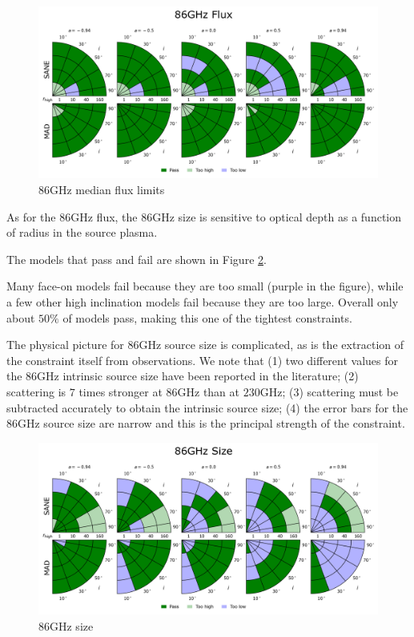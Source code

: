 \begin{figure}
  \centering
  \includegraphics[width=\columnwidth]{./figures/86GHz_flux_Constraints.png}
  \caption{86GHz median flux limits}
  \label{fig:cmp_86ghz_flux}
\end{figure}



As for the $86$GHz flux, the $86$GHz size is sensitive to optical depth as a function of radius in the source plasma.

The models that pass and fail are shown in Figure \ref{fig:cmp_86ghz_size}.

Many face-on models fail because they are too small (purple in the figure), while a few other high inclination models fail because they are too large.  Overall only about $50\%$ of models pass, making this one of the tightest constraints.

The physical picture for 86GHz source size is complicated, as is the extraction of the constraint itself from observations.  We note that (1) two different values for the 86GHz intrinsic source size have been reported in the literature; (2) scattering is $7$ times stronger at $86$GHz than at $230$GHz; (3) scattering must be subtracted accurately to obtain the intrinsic source size; (4) the error bars for the 86GHz source size are narrow and this is the principal strength of the constraint.

\begin{figure}
  \centering
  \includegraphics[width=\columnwidth]{./figures/86GHz_size_Constraints.png}
  \caption{86GHz size}
  \label{fig:cmp_86ghz_size}
\end{figure}

